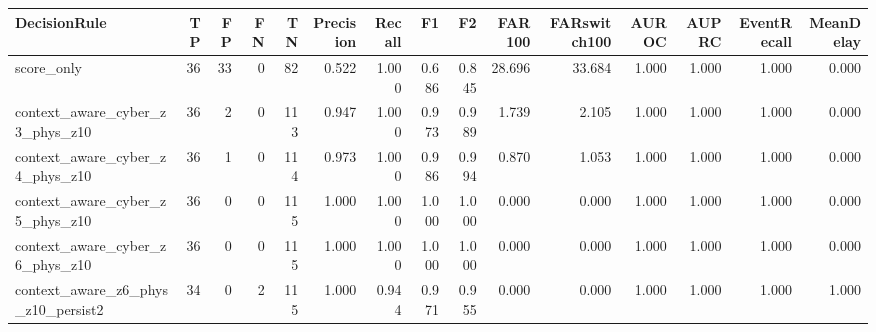 \begin{tabular}{lrrrrrrrrrrrrrr}
\toprule
DecisionRule & TP & FP & FN & TN & Precision & Recall & F1 & F2 & FAR100 & FARswitch100 & AUROC & AUPRC & EventRecall & MeanDelay \\
\midrule
score_only & 36 & 33 & 0 & 82 & 0.522 & 1.000 & 0.686 & 0.845 & 28.696 & 33.684 & 1.000 & 1.000 & 1.000 & 0.000 \\
context_aware_cyber_z3_phys_z10 & 36 & 2 & 0 & 113 & 0.947 & 1.000 & 0.973 & 0.989 & 1.739 & 2.105 & 1.000 & 1.000 & 1.000 & 0.000 \\
context_aware_cyber_z4_phys_z10 & 36 & 1 & 0 & 114 & 0.973 & 1.000 & 0.986 & 0.994 & 0.870 & 1.053 & 1.000 & 1.000 & 1.000 & 0.000 \\
context_aware_cyber_z5_phys_z10 & 36 & 0 & 0 & 115 & 1.000 & 1.000 & 1.000 & 1.000 & 0.000 & 0.000 & 1.000 & 1.000 & 1.000 & 0.000 \\
context_aware_cyber_z6_phys_z10 & 36 & 0 & 0 & 115 & 1.000 & 1.000 & 1.000 & 1.000 & 0.000 & 0.000 & 1.000 & 1.000 & 1.000 & 0.000 \\
context_aware_z6_phys_z10_persist2 & 34 & 0 & 2 & 115 & 1.000 & 0.944 & 0.971 & 0.955 & 0.000 & 0.000 & 1.000 & 1.000 & 1.000 & 1.000 \\
\bottomrule
\end{tabular}
